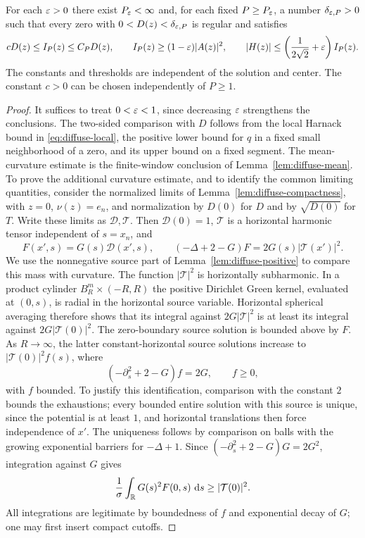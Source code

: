 \begin{lemma}\label{lem:interface-sharp-means}
For each $\varepsilon>0$ there exist $P_\varepsilon<\infty$ and, for each fixed
$P\ge P_\varepsilon$, a number $\delta_{\varepsilon,P}>0$ such that every zero with
$0<D(z)<\delta_{\varepsilon,P}$ is regular and satisfies
\begin{equation}\label{eq:L1}
 cD(z)\le I_P(z)\le C_P D(z),\qquad
 I_P(z)\ge(1-\varepsilon)|A(z)|^2,\qquad
 |H(z)|\le\left(\frac1{2\sqrt2}+\varepsilon\right)I_P(z).
\end{equation}
The constants and thresholds are independent of the solution and center.
The constant $c>0$ can be chosen independently of $P\ge1$.
\end{lemma}

\begin{proof}
It suffices to treat $0<\varepsilon<1$, since decreasing $\varepsilon$ strengthens
the conclusions.  The two-sided comparison with $D$ follows from the local Harnack bound in
\eqref{eq:diffuse-local}, the positive lower bound for $q$ in a fixed
small neighborhood of a zero, and its upper bound on a fixed segment.
The mean-curvature estimate is the finite-window conclusion of
Lemma~\ref{lem:diffuse-mean}.  To prove the additional curvature
estimate, and to identify the common limiting quantities, consider the
normalized limits of Lemma~\ref{lem:diffuse-compactness},
with $z=0$, $\nu(z)=e_n$, and normalization by $D(0)$ for $D$ and by
$\sqrt{D(0)}$ for $T$.  Write these limits as $\mathcal D,\mathcal T$.
Then $\mathcal D(0)=1$, $\mathcal T$ is a horizontal harmonic tensor
independent of $s=x_n$, and
\[
 F(x',s)=G(s)\mathcal D(x',s),\qquad
 (-\Delta+2-G)F=2G(s)|\mathcal T(x')|^2.
\]
We use the nonnegative source part of
Lemma~\ref{lem:diffuse-positive} to compare this mass with curvature.
The function $|\mathcal T|^2$ is horizontally subharmonic.  In a product cylinder
$B_R^m\times(-R,R)$ the positive Dirichlet Green kernel, evaluated at
$(0,s)$, is radial in the horizontal source variable.  Horizontal
spherical averaging therefore shows that its integral against
$2G|\mathcal T|^2$ is at least its integral against
$2G|\mathcal T(0)|^2$.  The zero-boundary source solution is bounded
above by $F$.  As $R\to\infty$, the latter constant-horizontal source
solutions increase to $|\mathcal T(0)|^2 f(s)$, where
\[
 (-\partial_s^2+2-G)f=2G,\qquad f\ge0,
\]
with $f$ bounded.  To justify this identification, comparison with
the constant $2$ bounds the exhaustions; every bounded entire
solution with this source is unique, since the potential is at least
$1$, and horizontal translations then force independence of $x'$.
The uniqueness follows by comparison on balls with the growing
exponential barriers for $-\Delta+1$.
Since $(-\partial_s^2+2-G)G=2G^2$, integration against $G$ gives
\[
 \frac1\sigma\int_\mathbb R G(s)^2F(0,s)\,\,\mathrm d s
       \ge |\mathcal T(0)|^2.
\]
All integrations are legitimate by boundedness of $f$ and exponential
decay of $G$; one may first insert compact cutoffs.


\end{proof}

